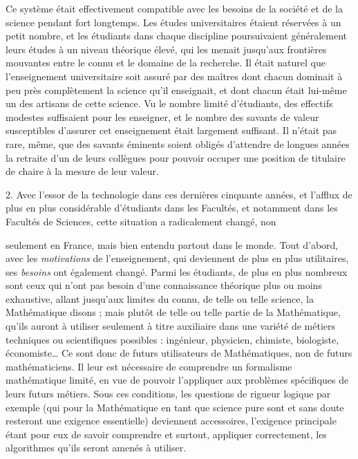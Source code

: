 \documentclass[11pt,a4paper]{article}
\begin{document}
Ce système était effectivement compatible avec les besoins de la
société et de la science pendant fort longtemps. Les études universitaires
étaient réservées à un petit nombre, et les étudiants dans chaque discipline
poursuivaient généralement leurs études à un niveau théorique élevé, qui les
menait jusqu'aux frontières mouvantes entre le connu et le domaine de la
recherche. Il était naturel que l'enseignement universitaire soit assuré par
des maîtres dont chacun dominait à peu près complètement la science qu'il
enseignait, et dont chacun était lui-même un des artisans de cette science.
Vu le nombre limité d'étudiants, des effectifs modestes suffisaient pour les
enseigner, et le nombre des savants de valeur susceptibles d'assurer cet
enseignement était largement suffisant. Il n'était pas rare, même, que des
savants éminents soient obligés d'attendre de longues années la retraite d'un
de leurs collègues pour pouvoir occuper une position de titulaire de chaire
à la mesure de leur valeur.

2. Avec l'essor de la technologie dans ces dernières cinquante années, et
l'afflux de plus en plus considérable d'étudiants dans les Facultés, et
notamment dans les Facultés de Sciences, cette situation a radicalement changé, non

seulement en France, mais bien entendu partout dans le monde. Tout d'abord,
avec les \emph{motivations} de l'enseignement, qui deviennent de plus en plus
utilitaires, ses \emph{besoins} ont également changé. Parmi les étudiants, de plus en
plus nombreux sont ceux qui n'ont pas besoin d'une connaissance théorique plus
ou moins exhaustive, allant jusqu'aux limites du connu, de telle ou telle
science, la Mathématique disons ; mais plutôt de telle ou telle partie de la
Mathématique, qu'ils auront à utiliser seulement à titre auxiliaire dans une
variété de métiers techniques ou scientifiques possibles : ingénieur,
physicien, chimiste, biologiste, économiste… Ce sont donc de futurs utilisateurs
de Mathématiques, non de futurs mathématiciens. Il leur est nécessaire de
comprendre un formalisme mathématique limité, en vue de pouvoir l'appliquer
aux problèmes spécifiques de leurs futurs métiers. Sous ces conditions, les
questions de rigueur logique par exemple (qui pour la Mathématique en tant
que science pure sont et sans doute resteront une exigence essentielle)
deviennent accessoires, l'exigence principale étant pour eux de savoir comprendre
et surtout, appliquer correctement, les algorithmes qu'ils seront amenés à
utiliser.
\end{document}
